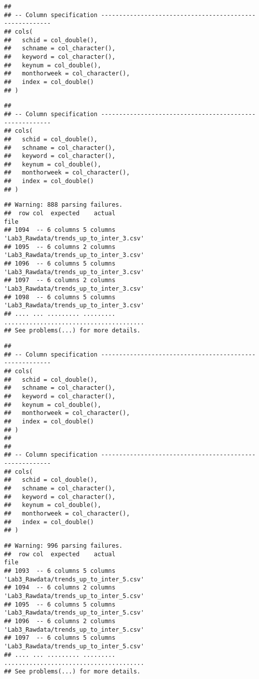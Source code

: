 \documentclass[
]{article}
\begin{document}
\begin{verbatim}
## 
## -- Column specification --------------------------------------------------------
## cols(
##   schid = col_double(),
##   schname = col_character(),
##   keyword = col_character(),
##   keynum = col_double(),
##   monthorweek = col_character(),
##   index = col_double()
## )
\end{verbatim}

\begin{verbatim}
## 
## -- Column specification --------------------------------------------------------
## cols(
##   schid = col_double(),
##   schname = col_character(),
##   keyword = col_character(),
##   keynum = col_double(),
##   monthorweek = col_character(),
##   index = col_double()
## )
\end{verbatim}

\begin{verbatim}
## Warning: 888 parsing failures.
##  row col  expected    actual                                    file
## 1094  -- 6 columns 5 columns 'Lab3_Rawdata/trends_up_to_inter_3.csv'
## 1095  -- 6 columns 2 columns 'Lab3_Rawdata/trends_up_to_inter_3.csv'
## 1096  -- 6 columns 5 columns 'Lab3_Rawdata/trends_up_to_inter_3.csv'
## 1097  -- 6 columns 2 columns 'Lab3_Rawdata/trends_up_to_inter_3.csv'
## 1098  -- 6 columns 5 columns 'Lab3_Rawdata/trends_up_to_inter_3.csv'
## .... ... ......... ......... .......................................
## See problems(...) for more details.
\end{verbatim}

\begin{verbatim}
## 
## -- Column specification --------------------------------------------------------
## cols(
##   schid = col_double(),
##   schname = col_character(),
##   keyword = col_character(),
##   keynum = col_double(),
##   monthorweek = col_character(),
##   index = col_double()
## )
## 
## 
## -- Column specification --------------------------------------------------------
## cols(
##   schid = col_double(),
##   schname = col_character(),
##   keyword = col_character(),
##   keynum = col_double(),
##   monthorweek = col_character(),
##   index = col_double()
## )
\end{verbatim}

\begin{verbatim}
## Warning: 996 parsing failures.
##  row col  expected    actual                                    file
## 1093  -- 6 columns 5 columns 'Lab3_Rawdata/trends_up_to_inter_5.csv'
## 1094  -- 6 columns 2 columns 'Lab3_Rawdata/trends_up_to_inter_5.csv'
## 1095  -- 6 columns 5 columns 'Lab3_Rawdata/trends_up_to_inter_5.csv'
## 1096  -- 6 columns 2 columns 'Lab3_Rawdata/trends_up_to_inter_5.csv'
## 1097  -- 6 columns 5 columns 'Lab3_Rawdata/trends_up_to_inter_5.csv'
## .... ... ......... ......... .......................................
## See problems(...) for more details.
\end{verbatim}
\end{document}
